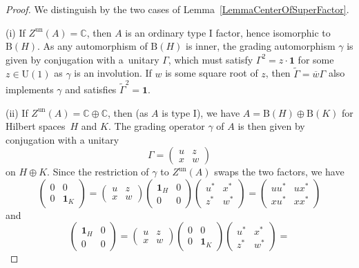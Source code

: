 \documentclass[10pt,a4paper]{amsart}
\numberwithin{equation}{section}
\newcommand{\C}{\mathbb{C}}
\newcommand{\B}{\mathrm{B}}
\newcommand{\U}{\mathrm{U}}
\begin{document}
\begin{proof}
We distinguish by the two cases of Lemma~\ref{LemmaCenterOfSuperFactor}.

(i) If $Z^{\mathrm{un}}(A) = \C$, then $A$ is an ordinary type I factor, hence isomorphic to $\B(H)$.
As any automorphism of $\B(H)$ is inner, the grading automorphism $\gamma$ is given by conjugation with a~unitary $\Gamma$, which must satisfy $\Gamma^2 = z \cdot\mathbf{1}$ for some $z \in \U(1)$ as $\gamma$ is an involution.
If $w$ is some square root of $z$, then $\tilde{\Gamma} = \overline{w} \Gamma$ also implements $\gamma$ and satisfies $\tilde{\Gamma}^2 = \mathbf{1}$.

(ii) If $Z^{\mathrm{un}}(A) = \C \oplus \C$, then (as $A$ is type I), we have $A = \B(H) \oplus \B(K)$ for Hilbert spaces~$H$ and $K$.
The grading operator $\gamma$ of $A$ is then given by conjugation with a unitary
\begin{equation*}
 \Gamma = \begin{pmatrix} u & z \\ x & w \end{pmatrix}
\end{equation*}
on $H \oplus K$.
Since the restriction of $\gamma$ to $Z^{\mathrm{un}}(A)$ swaps the two factors, we have
\begin{equation*}
\begin{pmatrix} 0 & 0 \\ 0 & \mathbf{1}_K \end{pmatrix}
 = \begin{pmatrix} u & z \\ x & w \end{pmatrix}\begin{pmatrix} \mathbf{1}_H & 0 \\ 0 & 0 \end{pmatrix}\begin{pmatrix} u^* & x^* \\ z^* & w^* \end{pmatrix} =
 \begin{pmatrix} uu^* & u x^* \\ xu^* & xx^* \end{pmatrix}
 \end{equation*}
 and
 \begin{equation*}
\begin{pmatrix} \mathbf{1}_H & 0 \\ 0 & 0 \end{pmatrix}
 = \begin{pmatrix} u & z \\ x & w \end{pmatrix}\begin{pmatrix} 0 & 0 \\ 0 & \mathbf{1}_K \end{pmatrix}\begin{pmatrix} u^* & x^* \\ z^* & w^* \end{pmatrix} =

\end{equation*}
\end{proof}
\end{document}
